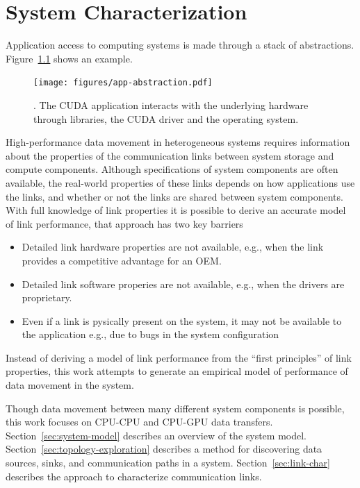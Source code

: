 \chapter{System Characterization}
\label{ch:sys-char}

Application access to computing systems is made through a stack of abstractions.
Figure~\ref{fig:app-abstraction} shows an example.

\begin{figure}[ht]
    \centering
    \texttt{[image: figures/app-abstraction.pdf]}
    \caption[]{. The CUDA application interacts with the underlying hardware through libraries, the CUDA driver and the operating system.}
    \label{fig:app-abstraction}
\end{figure}


High-performance data movement in heterogeneous systems requires information about the properties of the communication links between system storage and compute components.
Although specifications of system components are often available, the real-world properties of these links depends on how applications use the links, and whether or not the links are shared between system components.
With full knowledge of link properties it is possible to derive an accurate model of link performance, that approach has two key barriers
\begin{itemize}
    \item Detailed link hardware properties are not available, e.g., when the link provides a competitive advantage for an OEM.
    \item Detailed link software properies are not available, e.g., when the drivers are proprietary.
    \item Even if a link is pysically present on the system, it may not be available to the application {e.g., due to bugs in the system configuration}
\end{itemize}
Instead of deriving a model of link performance from the ``first principles'' of link properties, this work attempts to generate an empirical model of performance of data movement in the system.

Though data movement between many different system components is possible, this work focuses on CPU-CPU and CPU-GPU data transfers.
Section~\ref{sec:system-model} describes an overview of the system model.
Section~\ref{sec:topology-exploration} describes a method for discovering data sources, sinks, and communication paths in a system.
Section~\ref{sec:link-char} describes the approach to characterize communication links.


